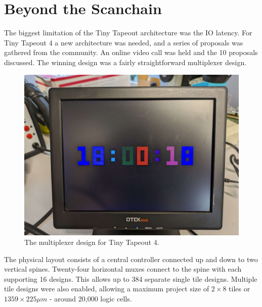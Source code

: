 \section{Beyond the Scanchain}
\label{sec:beyond_scanchain}
The biggest limitation of the Tiny Tapeout architecture was the IO latency.
For Tiny Tapeout 4 a new architecture was needed, and a series of proposals was gathered from the community.
An online video call was held and the 10 proposals discussed.
The winning design was a fairly straightforward multiplexer design.

\begin{figure}[htp]
\centering
\includegraphics[width=\columnwidth]{./Figs/tt3p5 vga clock.jpg}
\caption{The multiplexer design for Tiny Tapeout 4.}
\label{fig:multiplexer_design}
\end{figure}

The physical layout consists of a central controller connected up and down to two vertical spines.
Twenty-four horizontal muxes connect to the spine with each supporting 16 designs.
This allows up to 384 separate single tile designs.
Multiple tile designs were also enabled, allowing a maximum project size of \(2 \times 8\) tiles or \(1359 \times 225 \mu m\) - around 20,000 logic cells.

